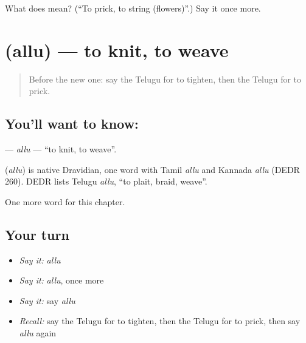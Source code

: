 \begin{tcolorbox}[breakable,colback=teal!4,colframe=teal!35!black,title={Before you move on}]
What does  mean? (\textquotedblleft{}To prick, to string (flowers)\textquotedblright{}.) Say it once more.
\end{tcolorbox}
\section[\texorpdfstring{\te{అల్లు} (allu)}{అల్లు (allu)}]{ (allu) — to knit, to weave}

\label{lesson:TE-C165-allu}



\begin{quote}
Before the new one: say the Telugu for to tighten, then the Telugu for to prick.
\end{quote}

\subsection*{You'll want to know: }
\textbf{} — \emph{allu} — \textquotedblleft{}to knit, to weave\textquotedblright{}.

\begin{cousinweb}
\textbf{} (\emph{allu}) is native Dravidian, one word with Tamil \emph{allu} and Kannada \emph{allu} (DEDR 260). DEDR lists Telugu \emph{allu}, \textquotedblleft{}to plait, braid, weave\textquotedblright{}.
\end{cousinweb}

\begin{grammarlens}[title={What you've built}]
One more word for this chapter.
\end{grammarlens}

\subsection*{Your turn}
\begin{itemize}
\raggedright
  \item \emph{Say it:} \emph{allu}
  \item \emph{Say it:} \emph{allu}, once more
  \item \emph{Say it:} say \emph{allu}
  \item \emph{Recall:} say the Telugu for to tighten, then the Telugu for to prick, then say \emph{allu} again
\end{itemize}

